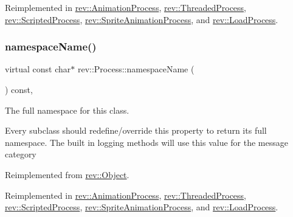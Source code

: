 Reimplemented in \mbox{\hyperlink{classrev_1_1_animation_process_a1956615907f3d2d32318d91d21a0df80}{rev\+::\+Animation\+Process}}, \mbox{\hyperlink{classrev_1_1_threaded_process_a7b198a27cb18d6da765cef1ed66a169c}{rev\+::\+Threaded\+Process}}, \mbox{\hyperlink{classrev_1_1_scripted_process_acf76a8590e80b9cf16c155639d721065}{rev\+::\+Scripted\+Process}}, \mbox{\hyperlink{classrev_1_1_sprite_animation_process_ad475b084f8d64cfb7a06a0456b215dbb}{rev\+::\+Sprite\+Animation\+Process}}, and \mbox{\hyperlink{classrev_1_1_load_process_ad826a8b7aab260c491bcd4344564947d}{rev\+::\+Load\+Process}}.

\mbox{\label{classrev_1_1_process_a7f5a6ab8af65aec3132f6a072b9fcb87}} 
\subsubsection{\texorpdfstring{namespaceName()}{namespaceName()}}
{\footnotesize\ttfamily virtual const char$\ast$ rev\+::\+Process\+::namespace\+Name (\begin{DoxyParamCaption}{ }\end{DoxyParamCaption}) const\hspace{0.3cm}{\ttfamily [inline]}, {\ttfamily [virtual]}}



The full namespace for this class. 

Every subclass should redefine/override this property to return its full namespace. The built in logging methods will use this value for the message category 

Reimplemented from \mbox{\hyperlink{classrev_1_1_object_aaeb638d3e10f361c56c211a318a27f3d}{rev\+::\+Object}}.



Reimplemented in \mbox{\hyperlink{classrev_1_1_animation_process_acb6fc0ee2382f8e5b09fd2d3f4847b27}{rev\+::\+Animation\+Process}}, \mbox{\hyperlink{classrev_1_1_threaded_process_a102e7ef754f41bb16225c4207b6b3c58}{rev\+::\+Threaded\+Process}}, \mbox{\hyperlink{classrev_1_1_scripted_process_a160dbc327ce205f9999d8c5c276559a9}{rev\+::\+Scripted\+Process}}, \mbox{\hyperlink{classrev_1_1_sprite_animation_process_acf80fb6d112c6d00a00bfa9620247e53}{rev\+::\+Sprite\+Animation\+Process}}, and \mbox{\hyperlink{classrev_1_1_load_process_aadfe0ec547dbda51e60517691617e88b}{rev\+::\+Load\+Process}}.

